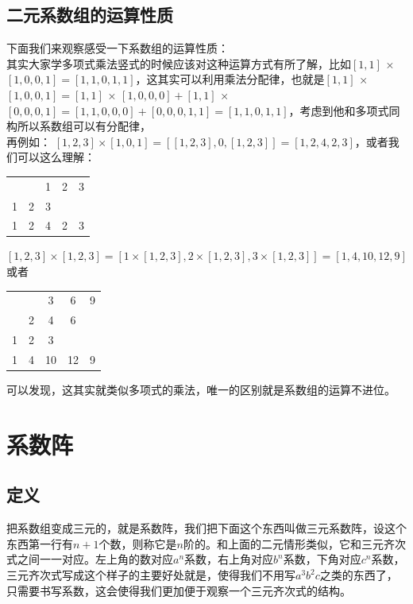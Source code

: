 \documentclass[UTF8]{ctexart}
\begin{document}
\subsection{二元系数组的运算性质}
下面我们来观察感受一下系数组的运算性质：\\
其实大家学多项式乘法竖式的时候应该对这种运算方式有所了解，比如$ [1,1]$ × $[1,0,0,1]=[1,1,0,1,1] $，这其实可以利用乘法分配律，也就是$ [1,1]$ × $[1,0,0,1]=[1,1]$ × $[1,0,0,0]+[1,1]$ × $[0,0,0,1]=[1,1,0,0,0]+[0,0,0,1,1]=[1,1,0,1,1] $，考虑到他和多项式同构所以系数组可以有分配律，\\
再例如：
$[1,2,3] \times[1,0,1]=[[1,2,3], 0,[1,2,3]]=[1,2,4,2,3]$，或者我们可以这么理解：
\begin{center}
	\begin{tabular}{ccccc}
		&  & 1 & 2 & 3 \\
		1& 2 & 3 &  &  \\
		\hline
		1& 2 & 4 & 2 & 3 \\
	\end{tabular}
\end{center}
$[1,2,3] \times[1,2,3]=[1 \times[1,2,3], 2 \times[1,2,3], 3 \times[1,2,3]]=[1,4,10,12,9]$或者
\begin{center}
	\begin{tabular}{ccccc}
		
		&  & 3 & 6 & 9 \\
		& 2 & 4 & 6 &  \\
		1& 2 & 3 &  &  \\
		\hline
		1& 4 & 10 & 12 & 9 \\
	\end{tabular}
\end{center}
可以发现，这其实就类似多项式的乘法，唯一的区别就是系数组的运算不进位。
\section{系数阵}
\subsection{定义}
把系数组变成三元的，就是系数阵，我们把下面这个东西叫做三元系数阵，设这个东西第一行有$ n+1 $个数，则称它是$ n $阶的。和上面的二元情形类似，它和三元齐次式之间一一对应。左上角的数对应$ a^n $系数，右上角对应$ b^n $系数，下角对应$ c^n $系数，三元齐次式写成这个样子的主要好处就是，使得我们不用写$ a^{3}b^{2}c $之类的东西了，只需要书写系数，这会使得我们更加便于观察一个三元齐次式的结构。
\end{document}
